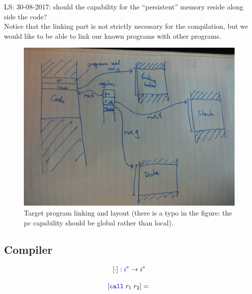 \documentclass[a4paper]{article}
\newcommand\lau[1]{{\color{purple} \sf \footnotesize {LS: #1}}\\}
\newcommand{\fun}{\rightarrow}
\newcommand{\sourcecolor}{\color{blue}}
\newcommand{\src}[1]{{\sourcecolor #1}}
\newcommand{\targetcolor}[1]{\color{black}}
\newcommand{\trg}[1]{{\targetcolor{} #1}}
\newcommand{\zinstr}[1]{\texttt{#1}}
\newcommand{\twoinstr}[3]{
  \ifthenelse{\equal{#2#3}{}}
  {\zinstr{#1}}
  {\zinstr{#1} \; #2 \; #3}
}
\newcommand{\scall}[2]{\twoinstr{\src{call}}{#1}{#2}}
\newcommand{\comp}[1]{[#1]}
\begin{document}
\lau{30-08-2017: should the capability for the ``persistent'' memory reside along side the code?}

Notice that the linking part is not strictly necessary for the compilation, but we would like to be able to link our known programs with other programs.

\begin{figure}
  \centering
  \includegraphics[width=\textwidth]{img/prog_layout.jpg}
  \caption{Target program linking and layout (there is a typo in the figure: the pc capability should be global rather than local).}
  \label{fig:trg-prog-link}
\end{figure}

\subsection{Compiler}
\[
\comp{\cdot} : \src{i}^* \fun \trg{i}^*
\]

\[
  \comp{\scall{r_1}{r_2}} = 
  \begin{array}[t]{l}
  \end{array}
\]
\end{document}
